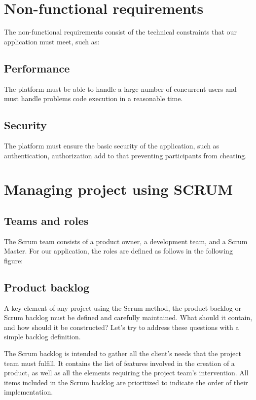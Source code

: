\section{Non-functional requirements}
The non-functional requirements consist of the technical constraints that our
application must meet, such as:

\subsection{Performance} The platform must be able to handle a large number of
concurrent users and must handle problems code execution in a reasonable time.

\subsection{Security} The platform must ensure the basic security of the
application, such as authentication, authorization add to that preventing
participants from cheating.

\section{Managing project using SCRUM}

\subsection{Teams and roles}
The Scrum team consists of a product owner, a development team, and a Scrum
Master. For our application, the roles are defined as follows in the following
figure:

\subsection{Product backlog}
A key element of any project using the Scrum method, the product backlog or
Scrum backlog must be defined and carefully maintained. What should it contain,
and how should it be constructed? Let's try to address these questions with a
simple backlog definition.

The Scrum backlog is intended to gather all the client's needs that the project
team must fulfill. It contains the list of features involved in the creation of
a product, as well as all the elements requiring the project team's
intervention. All items included in the Scrum backlog are prioritized to
indicate the order of their implementation.

